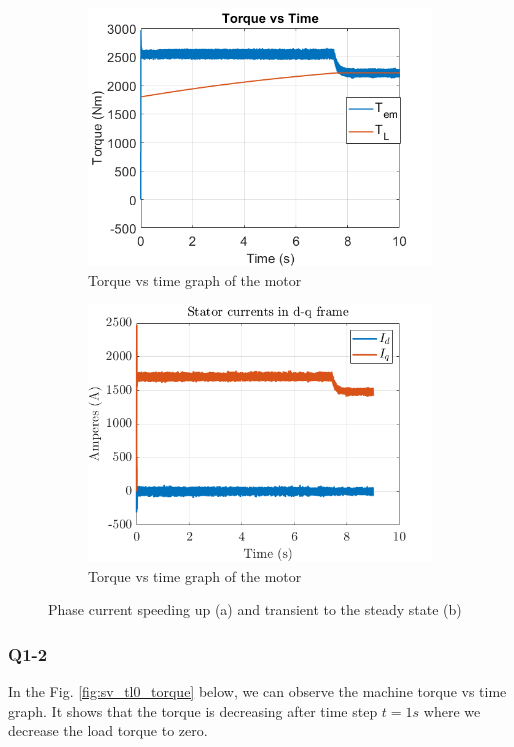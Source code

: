 \begin{figure}[H]
        \centering
        \begin{subfigure}[b]{0.475\textwidth}
            \centering
\includegraphics [width= 8 cm]{figs/torque_sv_new.png}
\caption{Torque vs time graph of the motor}
\label{fig:t2}
        \end{subfigure}
        \hfill
        \begin{subfigure}[b]{0.475\textwidth}  
            \centering
\includegraphics [width= 8 cm]{figs/d_q_currents.png}
\caption{Torque vs time graph of the motor}
\label{fig:dq2}
        \end{subfigure}
        \caption{Phase current speeding up (a) and transient to the steady state (b)}
        \label{fig:3phase}
        \end{figure}



\subsubsection{Q1-2}


In the Fig. \ref{fig:sv_tl0_torque} below, we can observe the machine torque vs time graph. It shows that the torque is decreasing after time step $t=1s$ where we decrease the load torque to zero.

